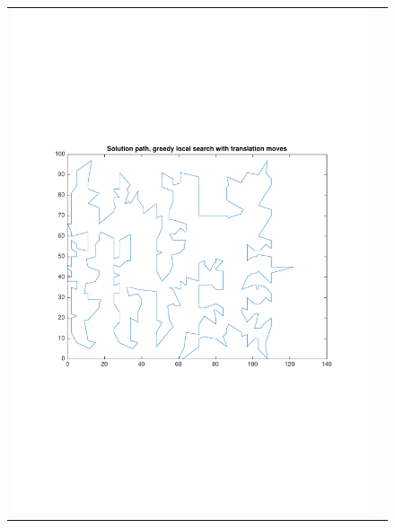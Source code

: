 \documentclass[a4paper, 11pt]{scrartcl}
\begin{document}
\begin{figure}[!ht]
\begin{tabular}{cc}
    \includegraphics[scale=0.4, trim={3cm 6cm 1cm 6cm}]{../figures/solutionPath_translation.pdf} \\ 

\end{tabular}
\end{figure}
\end{document}
